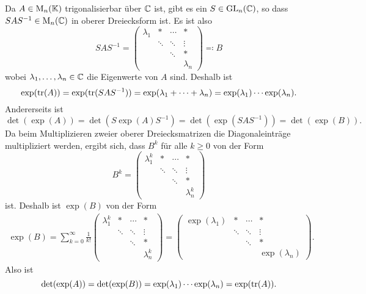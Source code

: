 \documentclass[a4paper, 10pt, numbers=noenddot]{scrartcl}
\begin{document}
Da $A \in \operatorname{M}_n(\mathbb{K})$ trigonalisierbar über $\mathbb{C}$ ist, gibt es ein $S \in \operatorname{GL}_n(\mathbb{C})$, so dass $S A S^{-1} \in \operatorname{M}_n(\mathbb{C})$ in oberer Dreiecksform ist. Es ist also
\[
  S A S^{-1}
  =
  \begin{pmatrix}
    \lambda_1 & *       & \cdots  & *         \\
              & \ddots  & \ddots  & \vdots    \\
              &         & \ddots  & *         \\
              &         &         & \lambda_n
  \end{pmatrix}
  \eqqcolon
  B
\]
wobei $\lambda_1, \dotsc, \lambda_n \in \mathbb{C}$ die Eigenwerte von $A$ sind.
Deshalb ist
\[
    \exp(\operatorname{tr}(A))
  = \exp(\operatorname{tr}(S A S^{-1}))
  = \exp(\lambda_1 + \dotsb + \lambda_n)
  = \exp(\lambda_1) \dotsm \exp(\lambda_n).
\]
Andererseits ist
\[
    \det(\exp(A))
  = \det(S \exp(A) S^{-1})
  = \det( \exp(S A S^{-1}) )
  = \det( \exp(B) ).
\]
Da beim Multiplizieren zweier oberer Dreiecksmatrizen die Diagonaleinträge multipliziert werden, ergibt sich, dass $B^k$ für alle $k \geq 0$ von der Form
\[
  B^k
  =
  \begin{pmatrix}
    \lambda_1^k & *       & \cdots  & *           \\
                & \ddots  & \ddots  & \vdots      \\
                &         & \ddots  & *           \\
                &         &         & \lambda_n^k
  \end{pmatrix}
\]
ist.
Deshalb ist $\exp(B)$ von der Form
\begin{align*}
      \exp(B)
  =  \sum_{k=0}^\infty
      \frac{1}{k!}
      \begin{pmatrix}
        \lambda_1^k  & *      & \cdots  & *             \\
                     & \ddots & \ddots  & \vdots        \\
                     &        & \ddots  & *             \\
                     &        &         & \lambda_n^k
      \end{pmatrix}
  =
      \begin{pmatrix}
        \exp(\lambda_1) & *       & \cdots  & *               \\
                        & \ddots  & \ddots  & \vdots          \\
                        &         & \ddots  & *               \\
                        &         &         & \exp(\lambda_n)
      \end{pmatrix}.
\end{align*}
Also ist
\[
    \det(\exp(A))
  = \det(\exp(B))
  = \exp(\lambda_1) \dotsm \exp(\lambda_n)
  = \exp(\operatorname{tr}(A)).
\]
\end{document}
